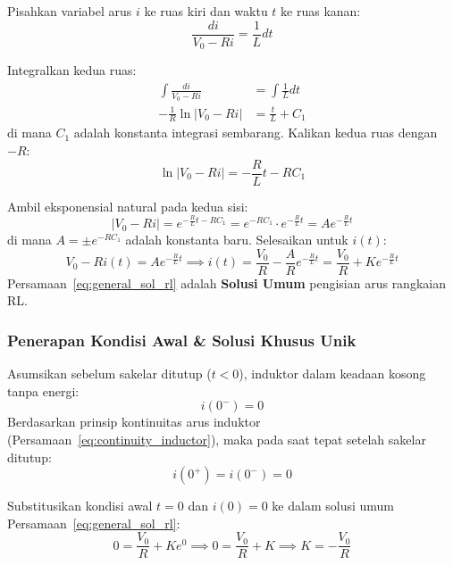 \documentclass[11pt,a4paper]{article}
\theoremstyle{definition}
\begin{document}
Pisahkan variabel arus $i$ ke ruas kiri dan waktu $t$ ke ruas kanan:
\begin{equation}
    \frac{di}{V_0 - R i} = \frac{1}{L} dt
\end{equation}

Integralkan kedua ruas:
\begin{align}
    \int \frac{di}{V_0 - R i} &= \int \frac{1}{L} dt \nonumber \\
    -\frac{1}{R} \ln|V_0 - R i| &= \frac{t}{L} + C_1
\end{align}
di mana $C_1$ adalah konstanta integrasi sembarang. Kalikan kedua ruas dengan $-R$:
\begin{equation}
    \ln|V_0 - R i| = -\frac{R}{L} t - R C_1
\end{equation}

Ambil eksponensial natural pada kedua sisi:
\begin{equation}
    |V_0 - R i| = e^{-\frac{R}{L} t - R C_1} = e^{-R C_1} \cdot e^{-\frac{R}{L} t} = A e^{-\frac{R}{L} t}
\end{equation}
di mana $A = \pm e^{-R C_1}$ adalah konstanta baru. Selesaikan untuk $i(t)$:
\begin{equation}
    V_0 - R i(t) = A e^{-\frac{R}{L} t} \implies i(t) = \frac{V_0}{R} - \frac{A}{R} e^{-\frac{R}{L} t} = \frac{V_0}{R} + K e^{-\frac{R}{L} t}
    \label{eq:general_sol_rl}
\end{equation}
Persamaan~\eqref{eq:general_sol_rl} adalah \textbf{Solusi Umum} pengisian arus rangkaian RL.

\subsubsection{Penerapan Kondisi Awal \& Solusi Khusus Unik}
Asumsikan sebelum sakelar ditutup ($t < 0$), induktor dalam keadaan kosong tanpa energi:
\begin{equation}
    i(0^-) = 0
\end{equation}
Berdasarkan prinsip kontinuitas arus induktor (Persamaan~\eqref{eq:continuity_inductor}), maka pada saat tepat setelah sakelar ditutup:
\begin{equation}
    i(0^+) = i(0^-) = 0
\end{equation}

Substitusikan kondisi awal $t = 0$ dan $i(0) = 0$ ke dalam solusi umum Persamaan~\eqref{eq:general_sol_rl}:
\begin{equation}
    0 = \frac{V_0}{R} + K e^0 \implies 0 = \frac{V_0}{R} + K \implies K = -\frac{V_0}{R}
\end{equation}
\end{document}
